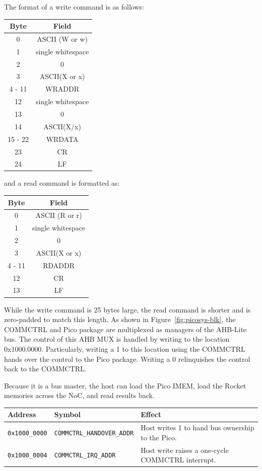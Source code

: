 The format of a write command is as follows:
\begin{center}
    \begin{tabular}{c c}
        \toprule 
        Byte & Field \\
        \midrule
        0 & ASCII (W or w)\\
        1 & single whitespace \\
        2 & 0 \\
        3 & ASCII(X or x)\\
        4 - 11 & WRADDR \\
        12 & single whitespace \\
        13 & 0 \\
        14 & ASCII(X/x) \\
        15 - 22 & WRDATA \\
        23 & CR \\
        24 & LF \\
        \bottomrule
    \end{tabular}
\end{center}
and a read command is formatted as:
\begin{center}
    \begin{tabular}{c c}
        \toprule 
        Byte & Field \\
        \midrule
        0 & ASCII (R or r)\\
        1 & single whitespace \\
        2 & 0 \\
        3 & ASCII(X or x)\\
        4 - 11 & RDADDR \\
        12 & CR \\
        13 & LF \\
        \bottomrule
    \end{tabular}
\end{center}
While the write command is 25 bytes large, the read command is shorter and is zero-padded to match this length. As shown in Figure~\ref{fig:picosys-blk}, the COMMCTRL and Pico package are multiplexed as managers of the AHB-Lite bus. The control of this AHB MUX is handled by writing to the location 0x1000.0000. Particularly, writing a 1 to this location using the COMMCTRL hands over the control to the Pico package. Writing a 0 relinquishes the control back to the COMMCTRL. 

Because it is a bus master, the host can load the Pico IMEM, load the Rocket memories across the NoC, and
read results back. 
\begin{center}
  \begin{tabular}{@{}lll@{}}
  \toprule
  \textbf{Address} & \textbf{Symbol} & \textbf{Effect} \\
  \midrule
  \texttt{0x1000\_0000} & \texttt{COMMCTRL\_HANDOVER\_ADDR} & Host writes 1 to hand bus ownership to the Pico. \\
  \texttt{0x1000\_0004} & \texttt{COMMCTRL\_IRQ\_ADDR}      & Host write raises a one-cycle COMMCTRL interrupt. \\
  \bottomrule
  \end{tabular}
\end{center}


